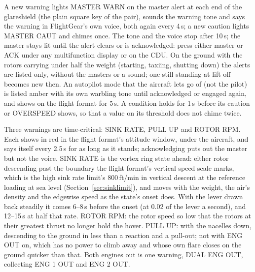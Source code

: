 \documentclass[11pt,a4paper,oneside]{book}
\newcommand{\Tab}[1]{}
\newcommand{\ann}[1]{\textsf{#1}}
\begin{document}
A new warning lights MASTER WARN on the master alert at each end of the glareshield (the plain square key of the
pair), sounds the warning tone and says the warning in FlightGear's own voice, both again every 4\,s; a new caution
lights MASTER CAUT and chimes once. The tone and the voice stop after 10\,s; the master stays lit until the alert
clears or is acknowledged: press either master or ACK under any multifunction display or on the CDU. On the ground
with the rotors carrying under half the weight (starting, taxiing, shutting down) the alerts are listed only, without
the masters or a sound; one still standing at lift-off becomes new then. An autopilot mode that the aircraft lets go
of (not the pilot) is listed amber with its own warbling tone until acknowledged or engaged again, and shows on the
flight format for 5\,s. A condition holds for 1\,s before its caution or \ann{OVERSPEED} shows, so that a value on its
threshold does not chime twice.

Three warnings are time-critical: \ann{SINK RATE}, \ann{PULL UP} and \ann{ROTOR RPM}. Each shows in red in the flight
format's attitude window, under the aircraft, and says itself every 2.5\,s for as long as it stands; acknowledging puts
out the master but not the voice. \ann{SINK RATE} is the vortex ring state ahead: either rotor descending past the
boundary the flight format's vertical speed scale marks, which is the high sink rate limit's 800\,ft/min in vertical
descent at the reference loading at sea level (Section~\ref{sec:sinklimit}), and moves with the weight, the air's
density and the edgewise speed as the state's onset does. With the lever drawn back steadily it comes 6--8\,s before
the onset (at 0.02 of the lever a second), and 12--15\,s at half that rate. \ann{ROTOR RPM}: the rotor speed so low that the rotors at their greatest thrust no longer hold the
hover. \ann{PULL UP}: with the nacelles down, descending to the ground in less than a reaction and a pull-out; not
with ENG OUT on, which has no power to climb away and whose own flare closes on the ground quicker than that.
Both engines out is one warning, \ann{DUAL ENG OUT}, collecting \ann{ENG 1 OUT} and \ann{ENG 2 OUT}.
\begin{center}\small\Tab{alerts}\end{center}
\end{document}

